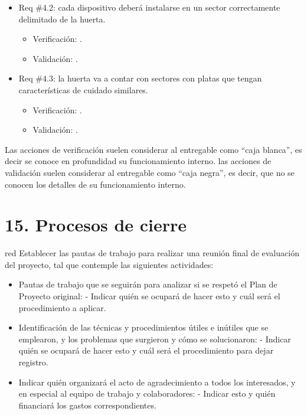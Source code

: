\documentclass[
11pt, %
codirector, %
]{charter}
\begin{document}
\begin{itemize}
\begin{itemize}
	\item Req \#4.2: cada dispositivo deberá instalarse en un sector correctamente delimitado de la huerta.
		\begin{itemize}
		\item Verificación: .
		\item Validación: .\\
		\end{itemize}
		
	\item Req \#4.3: la huerta va a contar con sectores con platas que tengan características de cuidado similares.\\
		\begin{itemize}
		\item Verificación: .
		\item Validación: .\\
		\end{itemize}
		
	\end{itemize}
\end{itemize}

Las acciones de verificación suelen considerar al entregable como ``caja blanca'', es decir se conoce en profundidad su funcionamiento interno.
las acciones de validación suelen considerar al entregable como ``caja negra'', es decir, que no se conocen los detalles de su funcionamiento interno.


\section{15. Procesos de cierre}    
\label{sec:cierre}

\begin{consigna}{red}
Establecer las pautas de trabajo para realizar una reunión final de evaluación del proyecto, tal que contemple las siguientes actividades:

\begin{itemize}
	\item Pautas de trabajo que se seguirán para analizar si se respetó el Plan de Proyecto original:
	 - Indicar quién se ocupará de hacer esto y cuál será el procedimiento a aplicar. 
	\item Identificación de las técnicas y procedimientos útiles e inútiles que se emplearon, y los problemas que surgieron y cómo se solucionaron:
	 - Indicar quién se ocupará de hacer esto y cuál será el procedimiento para dejar registro.
	\item Indicar quién organizará el acto de agradecimiento a todos los interesados, y en especial al equipo de trabajo y colaboradores:
	  - Indicar esto y quién financiará los gastos correspondientes.
\end{itemize}

\end{consigna}
\end{document}
